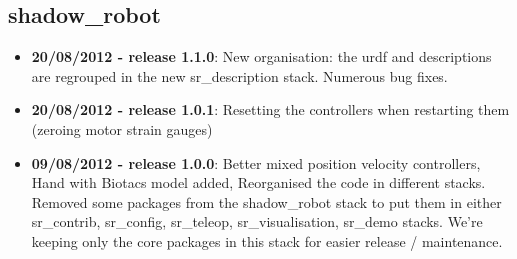 
\subsection{shadow\_robot}
\label{sec:shadow_robot_changelog}

\begin{itemize}
\item \textbf{20/08/2012 - release 1.1.0}: New organisation: the urdf and descriptions are regrouped in the new sr\_description stack. Numerous bug fixes.
\item \textbf{20/08/2012 - release 1.0.1}: Resetting the controllers when restarting them (zeroing motor strain gauges)
\item \textbf{09/08/2012 - release 1.0.0}: Better mixed position velocity controllers, Hand with Biotacs model added, Reorganised the code in different stacks. Removed some packages from the shadow\_robot stack to put them in either sr\_contrib, sr\_config, sr\_teleop, sr\_visualisation, sr\_demo stacks. We're keeping only the core packages in this stack for easier release / maintenance.
\end{itemize}